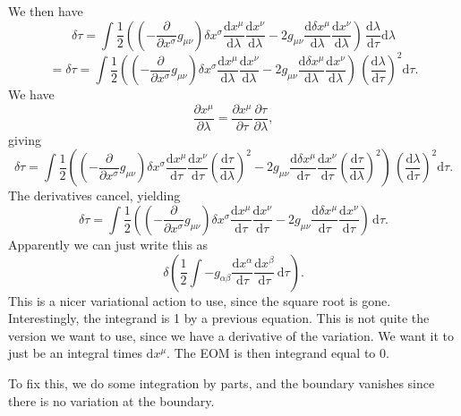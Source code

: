 We then have
\[
	\delta \tau =\int \frac{1}{2} \left( \left(-\frac{\partial }{\partial x^\sigma } g_{\mu \nu }  \right) \delta x^\sigma \frac{\mathrm{d}x^\mu }{\mathrm{d}\lambda } \frac{\mathrm{d}x^\nu }{\mathrm{d}\lambda } - 2g_{\mu \nu } \frac{\mathrm{d}\delta x^\mu }{\mathrm{d}\lambda } \frac{\mathrm{d}x^\nu }{\mathrm{d}\lambda } \right)\, \frac{\mathrm{d}\lambda }{\mathrm{d}\tau } \mathrm{d} \lambda 
\]
\[
	=\delta \tau =\int \frac{1}{2} \left( \left(-\frac{\partial }{\partial x^\sigma } g_{\mu \nu }  \right) \delta x^\sigma \frac{\mathrm{d}x^\mu }{\mathrm{d}\lambda } \frac{\mathrm{d}x^\nu }{\mathrm{d}\lambda } - 2g_{\mu \nu } \frac{\mathrm{d}\delta x^\mu }{\mathrm{d}\lambda } \frac{\mathrm{d}x^\nu }{\mathrm{d}\lambda } \right)\,\left( \frac{\mathrm{d}\lambda }{\mathrm{d}\tau } \right) ^2 \mathrm{d} \tau
.\]
We have
\[
	\frac{\partial x^\mu }{\partial \lambda } =\frac{\partial x^\mu }{\partial \tau } \frac{\partial \tau }{\partial \lambda } ,
\]
giving
\[
	\delta \tau =\int \frac{1}{2} \left( \left(-\frac{\partial }{\partial x^\sigma } g_{\mu \nu }  \right) \delta x^\sigma \frac{\mathrm{d}x^\mu }{\mathrm{d}\tau } \frac{\mathrm{d}x^\nu }{\mathrm{d}\tau }\left( \frac{\mathrm{d}\tau }{\mathrm{d}\lambda }  \right) ^2 - 2g_{\mu \nu } \frac{\mathrm{d}\delta x^\mu }{\mathrm{d}\tau } \frac{\mathrm{d}x^\nu }{\mathrm{d}\tau  }\left( \frac{\mathrm{d}\tau }{\mathrm{d}\lambda }  \right) ^2 \right)\,\left( \frac{\mathrm{d}\lambda }{\mathrm{d}\tau } \right) ^2 \mathrm{d} \tau
.\]
The derivatives cancel, yielding
\[
	\delta \tau =\int \frac{1}{2} \left( \left(-\frac{\partial }{\partial x^\sigma } g_{\mu \nu }  \right) \delta x^\sigma \frac{\mathrm{d}x^\mu }{\mathrm{d}\tau } \frac{\mathrm{d}x^\nu }{\mathrm{d}\tau } - 2g_{\mu \nu } \frac{\mathrm{d}\delta x^\mu }{\mathrm{d}\tau } \frac{\mathrm{d}x^\nu }{\mathrm{d}\tau  } \right)\, \mathrm{d} \tau
.\]
Apparently we can just write this as
\[
	\delta \left( \frac{1}{2} \int -g_{\alpha \beta } \frac{\mathrm{d}x^\alpha }{\mathrm{d}\tau } \frac{\mathrm{d}x^\beta }{\mathrm{d}\tau }  \,\mathrm{d} \tau  \right) 
.\]
This is a nicer variational action to use, since the square root is gone. Interestingly, the integrand is 1 by a previous equation. This is not quite the version we want to use, since we have a derivative of the variation. We want it to just be an integral times $\mathrm{d} x^\mu $. The EOM is then integrand equal to 0.

To fix this, we do some integration by parts, and the boundary vanishes since there is no variation at the boundary.

